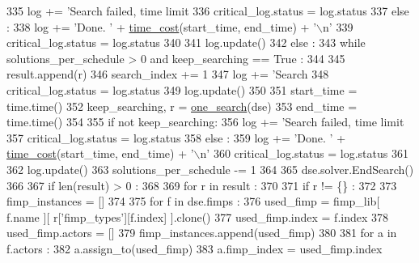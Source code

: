 \begin{DoxyCode}
{{{{{{{{{{{{{{{{335             log += \textcolor{stringliteral}{'Search failed, time limit %
336             critical\_log.status = log.status
337           \textcolor{keywordflow}{else} :
338             log += \textcolor{stringliteral}{'Done. '} + \hyperlink{namespacesylva_1_1dse_1_1dse_acf83688e18cc0859483b4c9bb70183fd}{time\_cost}(start\_time, end\_time) + \textcolor{stringliteral}{'\(\backslash\)n'}
339             critical\_log.status = log.status
340 
341           log.update()
342       \textcolor{keywordflow}{else} :
343         \textcolor{keywordflow}{while} solutions\_per\_schedule > 0 \textcolor{keywordflow}{and} keep\_searching == \textcolor{keyword}{True} :
344 
345           result.append(r)
346           search\_index += 1
347           log += \textcolor{stringliteral}{'Search %
348           critical\_log.status = log.status
349           log.update()
350 
351           start\_time = time.time()
352           keep\_searching, r = \hyperlink{namespacesylva_1_1dse_1_1dse_a27653b05dda8ab9dab8aa948db5b860a}{one\_search}(dse)
353           end\_time = time.time()
354 
355           \textcolor{keywordflow}{if} \textcolor{keywordflow}{not} keep\_searching:
356             log += \textcolor{stringliteral}{'Search failed, time limit %
357             critical\_log.status = log.status
358           \textcolor{keywordflow}{else} :
359             log += \textcolor{stringliteral}{'Done. '} + \hyperlink{namespacesylva_1_1dse_1_1dse_acf83688e18cc0859483b4c9bb70183fd}{time\_cost}(start\_time, end\_time) + \textcolor{stringliteral}{'\(\backslash\)n'}
360             critical\_log.status = log.status
361 
362           log.update()
363           solutions\_per\_schedule -= 1
364 
365       dse.solver.EndSearch()
366 
367       \textcolor{keywordflow}{if} len(result) > 0 :
368 
369         \textcolor{keywordflow}{for} r \textcolor{keywordflow}{in} result :
370 
371           \textcolor{keywordflow}{if} r != \{\} :
372 
373             fimp\_instances = []
374 
375             \textcolor{keywordflow}{for} f \textcolor{keywordflow}{in} dse.fimps :
376               used\_fimp = fimp\_lib[ f.name ][ r[\textcolor{stringliteral}{'fimp\_types'}][f.index] ].clone()
377               used\_fimp.index = f.index
378               used\_fimp.actors = []
379               fimp\_instances.append(used\_fimp)
380 
381               \textcolor{keywordflow}{for} a \textcolor{keywordflow}{in} f.actors :
382                 a.assign\_to(used\_fimp)
383                 a.fimp\_index = used\_fimp.index
}}}}}}}}}}}}}}}}}}}
\end{DoxyCode}
